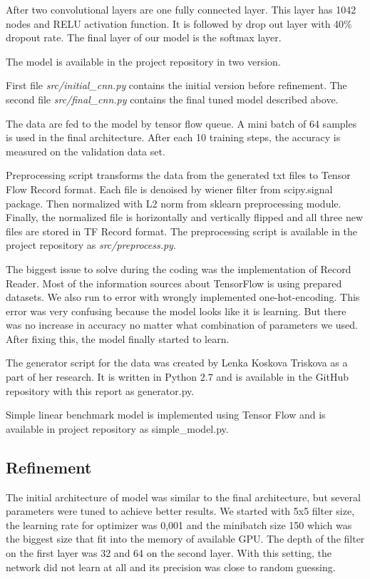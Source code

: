 \documentclass{article}
\begin{document}
After two convolutional layers are one fully connected layer. This layer
has 1042 nodes and RELU activation function. It is followed by drop out
layer with 40\% dropout rate. The final layer of our model is the
softmax layer.

The model is available in the project repository in two version. 

First file \textit{src/initial\_cnn.py} contains the initial version before refinement.
The second file \textit{src/final\_cnn.py} contains the final tuned model described above. 

The data are fed to the model by tensor flow queue. A mini batch of 64
samples is used in the final architecture. After each 10 training steps,
the accuracy is measured on the validation data set.

Preprocessing script transforms the data from the generated txt files to
Tensor Flow Record format. Each file is denoised by wiener filter from
scipy.signal package. Then normalized with L2 norm from sklearn
preprocessing module. Finally, the normalized file is horizontally and
vertically flipped and all three new files are stored in TF Record
format. The preprocessing script is available in the project repository
as \textit{src/preprocess.py}.


The biggest issue to solve during the coding was the implementation of Record
Reader. Most of the information sources   about TensorFlow is using prepared
datasets. We also run to error with wrongly implemented one-hot-encoding. This
error was very confusing because the model looks like it is learning. But there
was no increase in accuracy no matter what combination of parameters we used.
After fixing this, the model finally started to learn.

The generator script for the data was created by Lenka Koskova Triskova
as a part of her research. It is written in Python 2.7 and is available
in the GitHub repository with this report as generator.py.

Simple linear benchmark model is implemented using Tensor Flow and is
available in project repository as simple\_model.py.

\subsection{Refinement}\label{refinement}

The initial architecture of model was similar to the final architecture,
but several parameters were tuned to achieve better results. We started
with 5x5 filter size, the learning rate for optimizer was 0,001 and the
minibatch size 150 which was the biggest size that fit into the memory
of available GPU. The depth of the filter on the first layer was 32 and
64 on the second layer. With this setting, the network did not learn at
all and its precision was close to random guessing.
\end{document}
